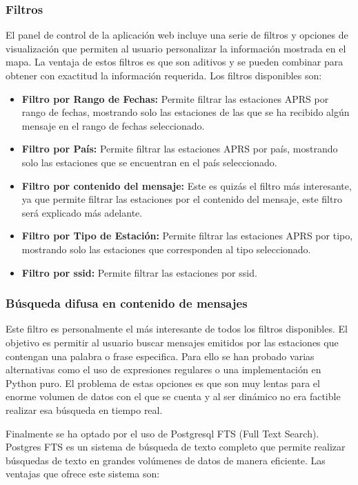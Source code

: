 \subsubsection*{Filtros}
El panel de control de la aplicación web incluye una serie de filtros y opciones de visualización que permiten al usuario personalizar la información mostrada en el mapa. La ventaja de estos filtros es que son aditivos y se pueden combinar para obtener con exactitud la información requerida. Los filtros disponibles son:

\begin{itemize}
	\item \textbf{Filtro por Rango de Fechas:} Permite filtrar las estaciones APRS por rango de fechas, mostrando solo las estaciones de las que se ha recibido algún mensaje en el rango de fechas seleccionado.
	\item \textbf{Filtro por País:} Permite filtrar las estaciones APRS por país, mostrando solo las estaciones que se encuentran en el país seleccionado.
	\item \textbf{Filtro por contenido del mensaje:} Este es quizás el filtro más interesante, ya que permite filtrar las estaciones por el contenido del mensaje, este filtro será explicado más adelante.
	\item \textbf{Filtro por Tipo de Estación:} Permite filtrar las estaciones APRS por tipo, mostrando solo las estaciones que corresponden al tipo seleccionado.
	\item \textbf{Filtro por ssid:} Permite filtrar las estaciones por ssid.
\end{itemize}

\subsubsection*{Búsqueda difusa en contenido de mensajes}
Este filtro es personalmente el más interesante de todos los filtros disponibles. El objetivo es permitir al usuario buscar mensajes emitidos por las estaciones que contengan una palabra o frase especifica. Para ello se han probado varias alternativas como el uso de expresiones regulares o una implementación en Python puro. El problema de estas opciones es que son muy lentas para el enorme volumen de datos con el que se cuenta y al ser dinámico no era factible realizar esa búsqueda en tiempo real.

Finalmente se ha optado por el uso de Postgresql FTS (Full Text Search). Postgres FTS es un sistema de búsqueda de texto completo que permite realizar búsquedas de texto en grandes volúmenes de datos de manera eficiente. Las ventajas que ofrece este sistema son:


